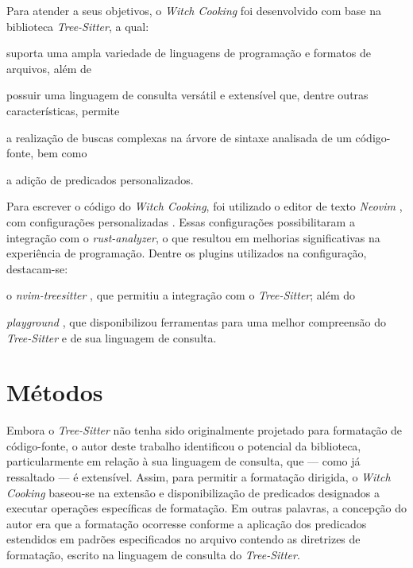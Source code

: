 \documentclass
  [11pt,a4paper,english,brazil,openright,sumario=tradicional,twoside]
  {abntex2}
\newcommand{\treesitter}{\textit{Tree-Sitter}\xspace}
\newcommand{\witchcooking}{\textit{Witch Cooking}\xspace}
\begin{document}
  Para atender a seus objetivos, o \witchcooking foi desenvolvido com base na
  biblioteca \treesitter \cite{tree-sitter-2023-tree}, a qual:
  \begin{inparaenum}
    \item suporta uma ampla variedade de linguagens de programação e formatos
          de arquivos, além de
    \item possuir uma linguagem de consulta versátil e extensível que, dentre
          outras características, permite
          \begin{inparaenum}
            \item a realização de buscas complexas na árvore de sintaxe
                  analisada de um código-fonte, bem como
            \item a adição de predicados personalizados.
          \end{inparaenum}
  \end{inparaenum}

  Para escrever o código do \witchcooking, foi utilizado o editor de texto
  \textit{Neovim} \cite{neovim-2023-hyperextensible}, com configurações
  personalizadas \cite{silva-2023-uma}. Essas configurações possibilitaram a
  integração com o \textit{rust-analyzer}, o que resultou em melhorias
  significativas na experiência de programação. Dentre os plugins utilizados na
  configuração, destacam-se:
  \begin{inparaenum}
    \item o \textit{nvim-treesitter} \cite{nvim-treesitter-2023-nvim}, que
          permitiu a integração com o \treesitter; além do
    \item \textit{playground} \cite{nvim-treesitter-2023-playground}, que
          disponibilizou ferramentas para uma melhor compreensão do \treesitter
          e de sua linguagem de consulta.
  \end{inparaenum}


  \section{Métodos}

  Embora o \treesitter não tenha sido originalmente projetado para formatação
  de código-fonte, o autor deste trabalho identificou o potencial da
  biblioteca, particularmente em relação à sua linguagem de consulta, que ---
  como já ressaltado --- é extensível. Assim, para permitir a formatação
  dirigida, o \witchcooking baseou-se na extensão e disponibilização de
  predicados designados a executar operações específicas de formatação. Em
  outras palavras, a concepção do autor era que a formatação ocorresse conforme
  a aplicação dos predicados estendidos em padrões especificados no arquivo
  contendo as diretrizes de formatação, escrito na linguagem de consulta do
  \treesitter.
\end{document}
